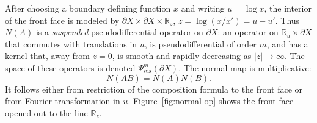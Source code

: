 \documentclass[12pt,oneside,reqno]{article}
\theoremstyle{plain}
\theoremstyle{definition}
\theoremstyle{remark}
\begin{document}
After choosing a boundary defining function \(x\) and writing
\(u=\log x\), the interior of the front face is modeled by
\(\partial X\times\partial X\times\mathbb R_z\), \(z=\log(x/x')=u-u'\).
Thus \(N(A)\) is a \emph{suspended} pseudodifferential operator on
\(\partial X\): an operator on \(\mathbb R_u\times\partial X\) that commutes
with translations in \(u\), is pseudodifferential of order \(m\), and has
a kernel that, away from \(z=0\), is smooth and rapidly decreasing as
\(|z|\to\infty\). The space of these operators is denoted
\(\Psi_{\mathrm{sus}}^m(\partial X)\). The normal map is
multiplicative:
\[
 N(AB)=N(A)N(B).
\]
It follows either from restriction of the composition formula to the front
face or from Fourier transformation in \(u\).  Figure~\ref{fig:normal-op}
shows the front face opened out to the line \(\mathbb R_z\).
\end{document}
